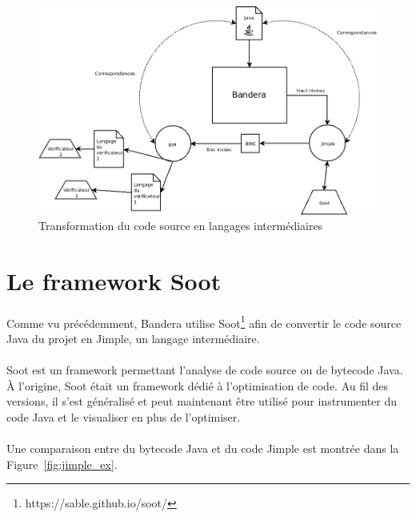 \begin{figure}[H]
  \centering
  \includegraphics[scale=0.5]{images/bandera_bir_jimple.png}
  \caption{\label{fig:bir_jimple} Transformation du code source en
    langages intermédiaires}
\end{figure}

\section{Le framework Soot}

\paragraph{}
Comme vu précédemment, Bandera utilise
Soot\footnote{https://sable.github.io/soot/}\cite{Soot} afin de
convertir le code source Java du projet en Jimple, un langage
intermédiaire.

\paragraph{}
Soot est un framework permettant l'analyse de code source ou de
bytecode Java. \` A l'origine, Soot était un framework dédié à
l'optimisation de code. Au fil des versions, il s'est généralisé et
peut maintenant être utilisé pour instrumenter du code Java et le
visualiser en plus de l'optimiser.

\paragraph{}
Une comparaison entre du bytecode Java et du code Jimple est montrée
dans la Figure~\ref{fig:jimple_ex}.

